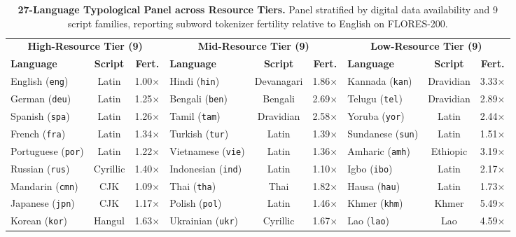 \documentclass[11pt]{article}
\begin{document}
\begin{table}[t]
\centering
\small
\setlength{\tabcolsep}{6pt}
\begin{tabular*}{\textwidth}{@{\extracolsep{\fill}}lcc|lcc|lcc@{}}
\toprule
\multicolumn{3}{c|}{\textbf{High-Resource Tier (9)}} & \multicolumn{3}{c|}{\textbf{Mid-Resource Tier (9)}} & \multicolumn{3}{c}{\textbf{Low-Resource Tier (9)}} \\
\textbf{Language} & \textbf{Script} & \textbf{Fert.} & \textbf{Language} & \textbf{Script} & \textbf{Fert.} & \textbf{Language} & \textbf{Script} & \textbf{Fert.} \\
\midrule
English (\texttt{eng}) & Latin & 1.00$\times$ & Hindi (\texttt{hin}) & Devanagari & 1.86$\times$ & Kannada (\texttt{kan}) & Dravidian & 3.33$\times$ \\
German (\texttt{deu}) & Latin & 1.25$\times$ & Bengali (\texttt{ben}) & Bengali & 2.69$\times$ & Telugu (\texttt{tel}) & Dravidian & 2.89$\times$ \\
Spanish (\texttt{spa}) & Latin & 1.26$\times$ & Tamil (\texttt{tam}) & Dravidian & 2.58$\times$ & Yoruba (\texttt{yor}) & Latin & 2.44$\times$ \\
French (\texttt{fra}) & Latin & 1.34$\times$ & Turkish (\texttt{tur}) & Latin & 1.39$\times$ & Sundanese (\texttt{sun}) & Latin & 1.51$\times$ \\
Portuguese (\texttt{por}) & Latin & 1.22$\times$ & Vietnamese (\texttt{vie}) & Latin & 1.36$\times$ & Amharic (\texttt{amh}) & Ethiopic & 3.19$\times$ \\
Russian (\texttt{rus}) & Cyrillic & 1.40$\times$ & Indonesian (\texttt{ind}) & Latin & 1.10$\times$ & Igbo (\texttt{ibo}) & Latin & 2.17$\times$ \\
Mandarin (\texttt{cmn}) & CJK & 1.09$\times$ & Thai (\texttt{tha}) & Thai & 1.82$\times$ & Hausa (\texttt{hau}) & Latin & 1.73$\times$ \\
Japanese (\texttt{jpn}) & CJK & 1.17$\times$ & Polish (\texttt{pol}) & Latin & 1.46$\times$ & Khmer (\texttt{khm}) & Khmer & 5.49$\times$ \\
Korean (\texttt{kor}) & Hangul & 1.63$\times$ & Ukrainian (\texttt{ukr}) & Cyrillic & 1.67$\times$ & Lao (\texttt{lao}) & Lao & 4.59$\times$ \\
\bottomrule
\end{tabular*}
\caption{\textbf{27-Language Typological Panel across Resource Tiers.} Panel stratified by digital data availability \citep{joshi2020state} and 9 script families, reporting subword tokenizer fertility relative to English on FLORES-200.}
\label{tab:languages}
\end{table}
\end{document}

